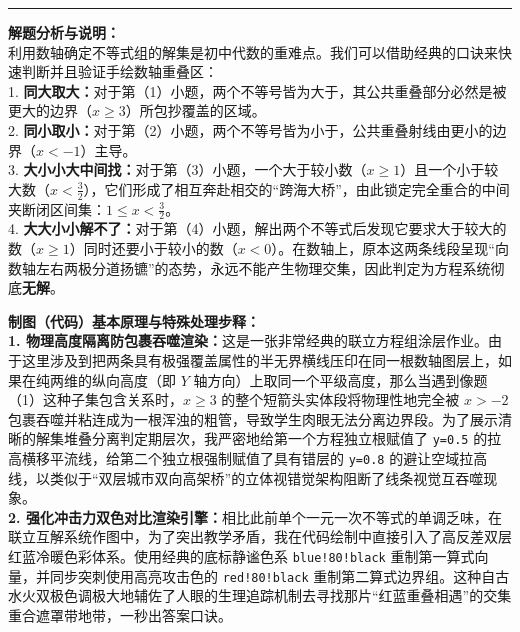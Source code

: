 \vspace{0.6cm}
\hrule
\vspace{0.4cm}

{\small\color{gray}
\textbf{解题分析与说明：}\\
利用数轴确定不等式组的解集是初中代数的重难点。我们可以借助经典的口诀来快速判断并且验证手绘数轴重叠区：\\
1. \textbf{同大取大：}对于第（1）小题，两个不等号皆为大于，其公共重叠部分必然是被更大的边界（$x \geqslant 3$）所包抄覆盖的区域。\\
2. \textbf{同小取小：}对于第（2）小题，两个不等号皆为小于，公共重叠射线由更小的边界（$x < -1$）主导。\\
3. \textbf{大小小大中间找：}对于第（3）小题，一个大于较小数（$x \geqslant 1$）且一个小于较大数（$x < \frac{3}{2}$），它们形成了相互奔赴相交的“跨海大桥”，由此锁定完全重合的中间夹断闭区间集：$1 \leqslant x < \frac{3}{2}$。\\
4. \textbf{大大小小解不了：}对于第（4）小题，解出两个不等式后发现它要求大于较大的数（$x \geqslant 1$）同时还要小于较小的数（$x < 0$）。在数轴上，原本这两条线段呈现“向数轴左右两极分道扬镳”的态势，永远不能产生物理交集，因此判定为方程系统彻底\textbf{无解}。
}

\vspace{0.6cm}

{\small\color{blue!70!black}
\textbf{制图（代码）基本原理与特殊处理步释：}\\
\textbf{1. 物理高度隔离防包裹吞噬渲染：}这是一张非常经典的联立方程组涂层作业。由于这里涉及到把两条具有极强覆盖属性的半无界横线压印在同一根数轴图层上，如果在纯两维的纵向高度（即 $Y$ 轴方向）上取同一个平级高度，那么当遇到像题（1）这种子集包含关系时，$x \geqslant 3$ 的整个短箭头实体段将物理性地完全被 $x > -2$ 包裹吞噬并粘连成为一根浑浊的粗管，导致学生肉眼无法分离边界段。为了展示清晰的解集堆叠分离判定期层次，我严密地给第一个方程独立根赋值了 \texttt{y=0.5} 的拉高横移平流线，给第二个独立根强制赋值了具有错层的 \texttt{y=0.8} 的避让空域拉高线，以类似于“双层城市双向高架桥”的立体视错觉架构阻断了线条视觉互吞噬现象。\\
\textbf{2. 强化冲击力双色对比渲染引擎：}相比此前单个一元一次不等式的单调乏味，在联立互解系统作图中，为了突出教学矛盾，我在代码绘制中直接引入了高反差双层红蓝冷暖色彩体系。使用经典的底标静谧色系 \texttt{blue!80!black} 重制第一算式向量，并同步突刺使用高亮攻击色的 \texttt{red!80!black} 重制第二算式边界组。这种自古水火双极色调极大地辅佐了人眼的生理追踪机制去寻找那片“红蓝重叠相遇”的交集重合遮罩带地带，一秒出答案口诀。
}

\newpage



